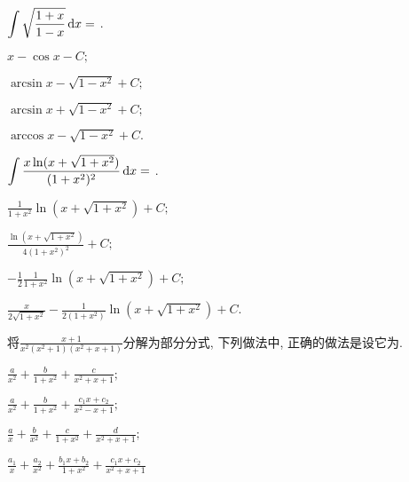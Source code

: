 \begin{problem} $\displaystyle \int \sqrt{\frac{1 + x}{1 - x}}\mathop{}\!\mathrm{d} x =$ .

\begin{abcd} \item $\displaystyle x - \cos x - C;$

\item $\displaystyle {\arcsin}x - \sqrt{1 - x^{2}} + C;$

\item $\displaystyle \arcsin x + \sqrt{1 - x^{2}} + C;$

\item $\displaystyle {\arccos}x - \sqrt{1 - x^{2}} + C.$

\end{abcd}

\end{problem}           

\begin{problem}
$\displaystyle \int {\frac{x\ln(x + \sqrt{1 + x^{2}})}{(1 + x^{2})^{2}}\mathop{}\!\mathrm{d}x=}$ .

\begin{abcd} \item $\displaystyle \frac{1}{1 + x^{2}}\ln(x + \sqrt{1 + x^{2}}) + C;$

\item $\displaystyle \frac{\ln(x + \sqrt{1 + x^{2}})}{4(1 + x^{2})^{2}} + C;$

\item $\displaystyle - \frac{1}{2}\frac{1}{1 + x^{2}}\ln(x + \sqrt{1 + x^{2}}) + C;$ 
\item
$\displaystyle \frac{x}{2\sqrt{1 + x^{2}}} - \frac{1}{2(1 + x^{2})}\ln(x + \sqrt{1 + x^{2}}) + C.$

\end{abcd}

\end{problem}           

\begin{problem}
将$\displaystyle \frac{x + 1}{x^{2}(x^{2} + 1)(x^{2} + x + 1)}$分解为部分分式, 下列做法中, 正确的做法是设它为.

\begin{abcd} 
	
\item $\displaystyle \frac{a}{x^{2}} + \frac{b}{1 + x^{2}} + \frac{c}{x^{2} + x + 1};$

\item
$\displaystyle \frac{a}{x^{2}} + \frac{b}{1 + x^{2}} + \frac{c_{1}x + c_{2}}{x^{2} - x + 1};$

\item
$\displaystyle \frac{a}{x} + \frac{b}{x^{2}} + \frac{c}{1 + x^{2}} + \frac{d}{x^{2} + x + 1};$

\item
$\displaystyle \frac{a_{1}}{x} + \frac{a_{2}}{x^{2}} + \frac{b_{1}x + b_{2}}{1 + x^{2}} + \frac{c_{1}x + c_{2}}{x^{2} + x + 1}$

\end{abcd}

\end{problem}   

